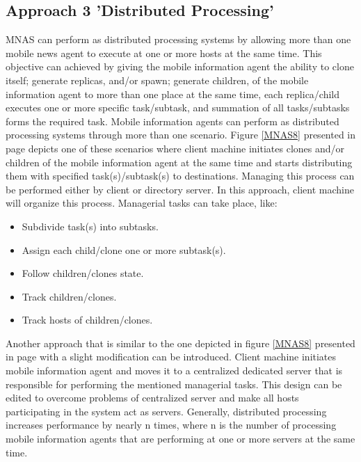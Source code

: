 \documentclass[12pt,a4paper,final,twoside,onecolumn,titlepage]{book}
\begin{document}
\subsection{Approach 3 'Distributed Processing'}
\gls{MNAS} can perform as distributed processing systems by allowing more than one mobile news agent to execute at one or more hosts at the same time. This objective can achieved by giving the mobile information agent the ability to clone itself; generate replicas, and/or spawn; generate children,  of the mobile information agent to more than one place at the same time, each replica/child executes one or more specific task/subtask, and summation of all tasks/subtasks forms the required task. Mobile information agents can perform as distributed processing systems through more than one scenario. Figure \ref{MNAS8} presented in page \pageref{MNAS8} depicts one of these scenarios where client machine initiates clones and/or children of the mobile information agent at the same time and starts distributing them with specified task(s)/subtask(s) to destinations. Managing this process can be performed either by client or directory server. In this approach, client machine will organize this process. Managerial tasks can take place, like:
\begin{itemize}
\item Subdivide task(s) into subtasks.
\item Assign each child/clone one or more subtask(s).
\item Follow children/clones state.
\item Track children/clones.
\item Track hosts of children/clones.
\end{itemize}
Another approach that is similar to the one depicted in figure \ref{MNAS8} presented in page \pageref{MNAS8} with a slight modification can be introduced. Client machine initiates mobile information agent and moves it to a centralized dedicated server that is responsible for performing the mentioned managerial tasks. This design can be edited to overcome problems of centralized server and make all hosts participating in the system act as servers. Generally, distributed processing increases performance by nearly n times, where n is the number of processing mobile information agents that are performing at one or more servers at the same time.
\end{document}
